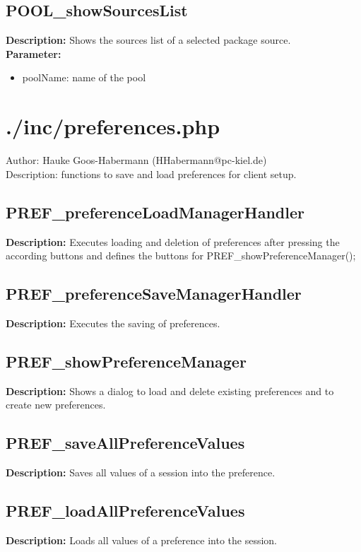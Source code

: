 \subsection{POOL\_showSourcesList}
\textbf{Description:} Shows the sources list of a selected package source.\\
\textbf{Parameter:}
\begin{itemize}
\item poolName: name of the pool
\end{itemize}

\newpage\section{./inc/preferences.php}
 Author: Hauke Goos-Habermann (HHabermann@pc-kiel.de)\\
 Description: functions to save and load preferences for client setup.\\

\subsection{PREF\_preferenceLoadManagerHandler}
\textbf{Description:} Executes loading and deletion of preferences after pressing the according buttons and defines the buttons for PREF\_showPreferenceManager();\\

\subsection{PREF\_preferenceSaveManagerHandler}
\textbf{Description:} Executes the saving of preferences.\\

\subsection{PREF\_showPreferenceManager}
\textbf{Description:} Shows a dialog to load and delete existing preferences and to create new preferences.\\

\subsection{PREF\_saveAllPreferenceValues}
\textbf{Description:} Saves all values of a session into the preference.\\

\subsection{PREF\_loadAllPreferenceValues}
\textbf{Description:} Loads all values of a preference into the session.\\

